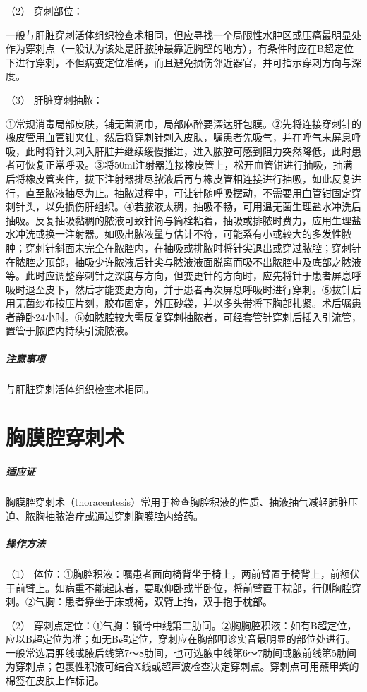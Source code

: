 \hypertarget{text00381.htmlux5cux23CHP16-7-5-2-1-2}{}
（2） 穿刺部位：

一般与肝脏穿刺活体组织检查术相同，但应寻找一个局限性水肿区或压痛最明显处作为穿刺点（一般认为该处是肝脓肿最靠近胸壁的地方），有条件时应在B超定位下进行穿刺，不但病变定位准确，而且避免损伤邻近器官，并可指示穿刺方向与深度。

\hypertarget{text00381.htmlux5cux23CHP16-7-5-2-1-3}{}
（3） 肝脏穿刺抽脓：

①常规消毒局部皮肤，铺无菌洞巾，局部麻醉要深达肝包膜。②先将连接穿刺针的橡皮管用血管钳夹住，然后将穿刺针刺入皮肤，嘱患者先吸气，并在呼气末屏息呼吸，此时将针头刺入肝脏并继续缓慢推进，进入脓腔可感到阻力突然降低，此时患者可恢复正常呼吸。③将50ml注射器连接橡皮管上，松开血管钳进行抽吸，抽满后将橡皮管夹住，拔下注射器排尽脓液后再与橡皮管相连接进行抽吸，如此反复进行，直至脓液抽尽为止。抽脓过程中，可让针随呼吸摆动，不需要用血管钳固定穿刺针头，以免损伤肝组织。④若脓液太稠，抽吸不畅，可用温无菌生理盐水冲洗后抽吸。反复抽吸黏稠的脓液可致针筒与筒栓粘着，抽吸或排脓时费力，应用生理盐水冲洗或换一注射器。如吸出脓液量与估计不符，可能系有小或较大的多发性脓肿；穿刺针斜面未完全在脓腔内，在抽吸或排脓时将针尖退出或穿过脓腔；穿刺针在脓腔之顶部，抽吸少许脓液后针尖与脓液液面脱离而吸不出脓腔中及底部之脓液等。此时应调整穿刺针之深度与方向，但变更针的方向时，应先将针于患者屏息呼吸时退至皮下，然后才能变更方向，并于患者再次屏息呼吸时进行穿刺。⑤拔针后用无菌纱布按压片刻，胶布固定，外压砂袋，并以多头带将下胸部扎紧。术后嘱患者静卧24小时。⑥如脓腔较大需反复穿刺抽脓者，可经套管针穿刺后插入引流管，置管于脓腔内持续引流脓液。

\subparagraph{注意事项}

与肝脏穿刺活体组织检查术相同。

\protect\hypertarget{text00382.html}{}{}

\section{胸膜腔穿刺术}

\subparagraph{适应证}

胸膜腔穿刺术（thoracentesis）常用于检查胸腔积液的性质、抽液抽气减轻肺脏压迫、脓胸抽脓治疗或通过穿刺胸膜腔内给药。

\subparagraph{操作方法}

（1）
体位：①胸腔积液：嘱患者面向椅背坐于椅上，两前臂置于椅背上，前额伏于前臂上。如病重不能起床者，要取仰卧或半卧位，将前臂置于枕部，行侧胸腔穿刺。②气胸：患者靠坐于床或椅，双臂上抬，双手抱于枕部。

（2）
穿刺点定位：①气胸：锁骨中线第二肋间。②胸胸腔积液：如有B超定位，应以B超定位为准；如无B超定位，穿刺应在胸部叩诊实音最明显的部位处进行。一般常选肩胛线或腋后线第7～8肋间，也可选腋中线第6～7肋间或腋前线第5肋间为穿刺点；包裹性积液可结合X线或超声波检查决定穿刺点。穿刺点可用蘸甲紫的棉签在皮肤上作标记。

